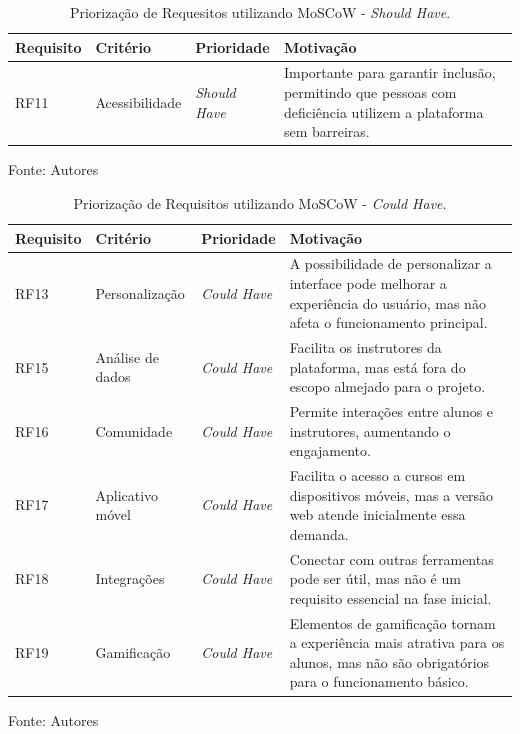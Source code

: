 \begin{apendicesenv}
\begin{table}[h]
    \centering
    \caption{Priorização de Requesitos utilizando MoSCoW - \textit{Should Have}.}
    \label{tab:priorizacao_moscow2}
    \begin{adjustbox}{width=\textwidth}
        \begin{tabular}{|p{2.5cm}|p{5cm}|p{5cm}|p{4cm}|}
            \hline
            \textbf{Requisito} & \textbf{Critério} & \textbf{Prioridade} & \textbf{Motivação} \\
            \hline
            RF11 & Acessibilidade & \textit{Should Have} & Importante para garantir inclusão, permitindo que pessoas com deficiência utilizem a plataforma sem barreiras. \\
            \hline
        \end{tabular}
    \end{adjustbox}
    \vspace{5mm}
    {\footnotesize Fonte: Autores} 
\end{table}


\begin{table}[h]
    \centering
    \caption{Priorização de Requisitos utilizando MoSCoW - \textit{Could Have}.}
    \label{tab:priorizacao_moscow3}
    \begin{adjustbox}{width=\textwidth}
        \begin{tabular}{|p{2.5cm}|p{5cm}|p{5cm}|p{4cm}|}
            \hline
            \textbf{Requisito} & \textbf{Critério} & \textbf{Prioridade} & \textbf{Motivação} \\
            \hline
            RF13 & Personalização & \textit{Could Have} & A possibilidade de personalizar a interface pode melhorar a experiência do usuário, mas não afeta o funcionamento principal. \\
            \hline
            RF15 & Análise de dados & \textit{Could Have} & Facilita os instrutores da plataforma, mas está fora do escopo almejado para o projeto. \\
            \hline
            RF16 & Comunidade & \textit{Could Have} & Permite interações entre alunos e instrutores, aumentando o engajamento. \\
            \hline
            RF17 & Aplicativo móvel & \textit{Could Have} & Facilita o acesso a cursos em dispositivos móveis, mas a versão web atende inicialmente essa demanda. \\
            \hline
            RF18 & Integrações & \textit{Could Have} & Conectar com outras ferramentas pode ser útil, mas não é um requisito essencial na fase inicial. \\
            \hline
            RF19 & Gamificação & \textit{Could Have} & Elementos de gamificação tornam a experiência mais atrativa para os alunos, mas não são obrigatórios para o funcionamento básico. \\
            \hline
        \end{tabular}
    \end{adjustbox}
    \vspace{5mm}
    {\footnotesize Fonte: Autores} 
\end{table}



\end{apendicesenv}
